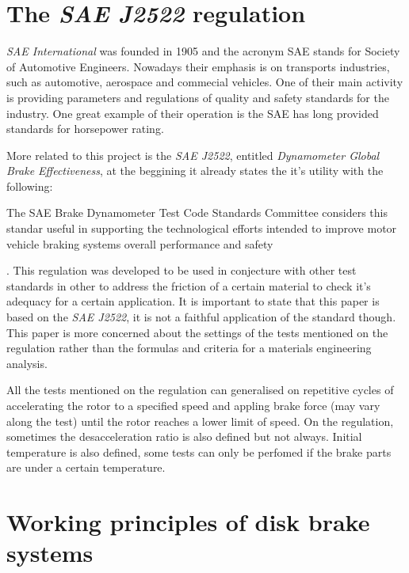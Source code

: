 	\section{The \textit{SAE J2522} regulation}

		\textit{SAE International} was founded in 1905 and the acronym SAE stands for Society of Automotive Engineers. Nowadays their emphasis is on transports industries, such as automotive, aerospace and commecial vehicles. One of their main activity is providing parameters and regulations of quality and safety standards for the industry. One great example of their operation is the SAE has long provided standards for horsepower rating.
		\par
		More related to this project is the \textit{SAE J2522}, entitled \textit{Dynamometer Global Brake Effectiveness}, at the beggining it already states the it's utility with the following:

		\begin{displayquote}
			The SAE Brake Dynamometer Test Code Standards Committee considers this standar useful in supporting the technological efforts intended to improve motor vehicle braking systems overall performance and safety
		\end{displayquote}

		\cite{SAE J2522}. This regulation was developed to be used in conjecture with other test standards in other to address the friction of a certain material to check it's adequacy for a certain application. It is important to state that this paper is based on the \textit{SAE J2522}, it is not a faithful application of the standard though. This paper is more concerned about the settings of the tests mentioned on the regulation rather than the formulas and criteria for a materials engineering analysis.
		\par
		All the tests mentioned on the regulation can generalised on repetitive cycles of accelerating the rotor to a specified speed and appling brake force (may vary along the test) until the rotor reaches a lower limit of speed. On the regulation, sometimes the desacceleration ratio is also defined but not always. Initial temperature is also defined, some tests can only be perfomed if the brake parts are under a certain temperature.


	\section{Working principles of disk brake systems}

